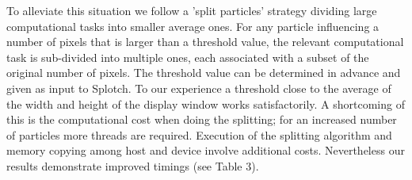 \documentclass[1p,times]{elsarticle}
\begin{document}
To alleviate this situation we follow a 'split particles' strategy 
dividing large computational tasks into smaller average ones.  For any particle 
influencing a number of pixels that is larger than a threshold value, the relevant 
computational task is sub-divided into multiple ones, each associated with a subset 
of the original number of pixels. The threshold value 
can be determined in advance and given as input to Splotch. To our experience a threshold close to 
the average of the width and height of the display window works satisfactorily. 
A shortcoming of this is the computational cost when doing the splitting; for an increased number of particles 
more threads are required. Execution of the splitting algorithm 
and memory copying among host and device involve additional costs. 
Nevertheless our results demonstrate improved timings (see Table 3).


\end{document}
